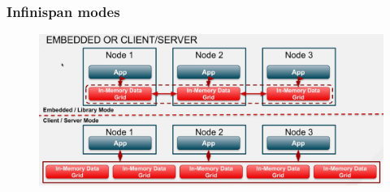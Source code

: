 \documentclass[10pt,utf8]{beamer}
\begin{document}
\begin{frame}
	\frametitle{Infinispan modes}
	\begin{figure}
		\centering
		\includegraphics[width=12cm]{./img/ispn_modes.eps}
	\end{figure}
\end{frame}
\end{document}
